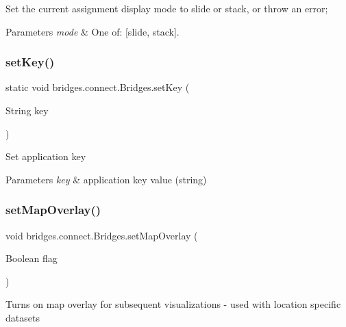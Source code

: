 Set the current assignment display mode to slide or stack, or throw an error; 
\begin{DoxyParams}{Parameters}
{\em mode} & One of\+: \mbox{[}\textquotesingle{}slide\textquotesingle{}, \textquotesingle{}stack\textquotesingle{}\mbox{]}. \\
\hline
\end{DoxyParams}
\mbox{\label{classbridges_1_1connect_1_1_bridges_ab69e89ec7d2e674a8b8c4b0be0c63397}} 
\subsubsection{\texorpdfstring{set\+Key()}{setKey()}}
{\footnotesize\ttfamily static void bridges.\+connect.\+Bridges.\+set\+Key (\begin{DoxyParamCaption}\item[{String}]{key }\end{DoxyParamCaption})\hspace{0.3cm}{\ttfamily [static]}}

Set application key


\begin{DoxyParams}{Parameters}
{\em key} & application key value (string) \\
\hline
\end{DoxyParams}
\mbox{\label{classbridges_1_1connect_1_1_bridges_a4af383ba2f114ad7bd4e08eb44096973}} 
\subsubsection{\texorpdfstring{set\+Map\+Overlay()}{setMapOverlay()}}
{\footnotesize\ttfamily void bridges.\+connect.\+Bridges.\+set\+Map\+Overlay (\begin{DoxyParamCaption}\item[{Boolean}]{flag }\end{DoxyParamCaption})}

Turns on map overlay for subsequent visualizations -\/ used with location specific datasets


